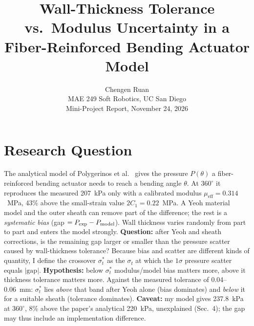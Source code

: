 \documentclass[12pt,letterpaper]{article}
\title{\vspace{-2em}\large\textbf{Wall-Thickness Tolerance vs.\ Modulus Uncertainty in a Fiber-Reinforced Bending Actuator Model}\vspace{-0.5em}}
\author{Chengen Ruan \\ MAE 249 Soft Robotics, UC San Diego \\ Mini-Project Report, November 24, 2026}
\date{}
\newcommand{\meff}{\mu_{\mathrm{eff}}}
\begin{document}
\maketitle
\vspace{-1.5em}

\section{Research Question}
The analytical model of Polygerinos et al.~\cite{poly2015} gives the pressure $P(\theta)$ a fiber-reinforced bending actuator needs to reach a bending angle $\theta$. At $360^\circ$ it reproduces the measured 207~kPa only with a calibrated modulus $\meff=0.314$~MPa, 43\% above the small-strain value $2C_1=0.22$~MPa. A Yeoh material model and the outer sheath can remove part of the difference; the rest is a \emph{systematic bias} (gap $=P_{\exp}-P_{\rm model}$). Wall thickness varies randomly from part to part and enters the model strongly. \textbf{Question:} after Yeoh and sheath corrections, is the remaining gap larger or smaller than the pressure scatter caused by wall-thickness tolerance? Because bias and scatter are different kinds of quantity, I define the crossover $\sigma_t^*$ as the $\sigma_t$ at which the $1\sigma$ pressure scatter equals $|\text{gap}|$. \textbf{Hypothesis:} below $\sigma_t^*$ modulus/model bias matters more, above it thickness tolerance matters more. Against the measured tolerance of 0.04--0.06~mm: $\sigma_t^*$ lies \emph{above} that band after Yeoh alone (bias dominates) and \emph{below} it for a suitable sheath (tolerance dominates). \textbf{Caveat:} my model gives 237.8~kPa at $360^\circ$, 8\% above the paper's analytical 220~kPa, unexplained (Sec.~4); the gap may thus include an implementation difference.
\end{document}
